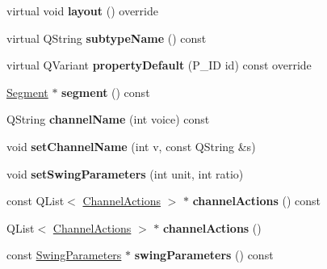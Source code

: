 \begin{DoxyCompactItemize}
virtual void {\bfseries layout} () override
\item 
\mbox{\label{class_ms_1_1_staff_text_aef0e14a035187c20527a6300283faf7e}} 
virtual Q\+String {\bfseries subtype\+Name} () const
\item 
\mbox{\label{class_ms_1_1_staff_text_aa71581c2bc47735a88fd0bb97e99ddcf}} 
virtual Q\+Variant {\bfseries property\+Default} (P\+\_\+\+ID id) const override
\item 
\mbox{\label{class_ms_1_1_staff_text_a890c8ab95128a6882acf1e507a487223}} 
\hyperlink{class_ms_1_1_segment}{Segment} $\ast$ {\bfseries segment} () const
\item 
\mbox{\label{class_ms_1_1_staff_text_a0c01e88bd015dac669430c62da1ab8b6}} 
Q\+String {\bfseries channel\+Name} (int voice) const
\item 
\mbox{\label{class_ms_1_1_staff_text_ae06e77f94630f958fe05dbba9eb2d694}} 
void {\bfseries set\+Channel\+Name} (int v, const Q\+String \&s)
\item 
\mbox{\label{class_ms_1_1_staff_text_af638ed3967b03e02e0d85268ce41f2eb}} 
void {\bfseries set\+Swing\+Parameters} (int unit, int ratio)
\item 
\mbox{\label{class_ms_1_1_staff_text_ad737daef5637991f395e52780f0ed41b}} 
const Q\+List$<$ \hyperlink{struct_ms_1_1_channel_actions}{Channel\+Actions} $>$ $\ast$ {\bfseries channel\+Actions} () const
\item 
\mbox{\label{class_ms_1_1_staff_text_a423c246d02f200a001d3c5afe9a5db3c}} 
Q\+List$<$ \hyperlink{struct_ms_1_1_channel_actions}{Channel\+Actions} $>$ $\ast$ {\bfseries channel\+Actions} ()
\item 
\mbox{\label{class_ms_1_1_staff_text_a943777cee3e8b49d5308f13394424a0a}} 
const \hyperlink{struct_ms_1_1_swing_parameters}{Swing\+Parameters} $\ast$ {\bfseries swing\+Parameters} () const
\item 
\mbox{\label{class_ms_1_1_staff_text_a0e1fa965291f13d6dc2fb6c20e7b4cf4}} 

\end{DoxyCompactItemize}
